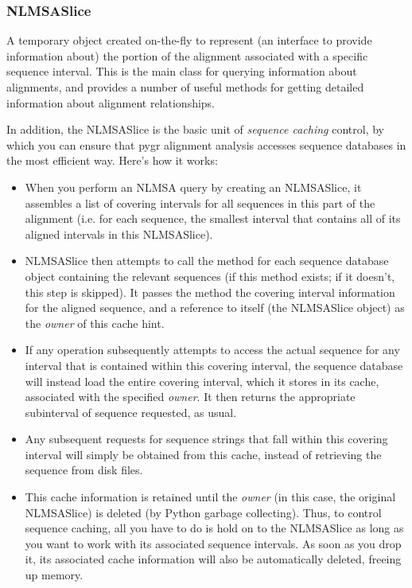 \documentclass{howto}
\begin{document}
\subsubsection{NLMSASlice}
A temporary object created on-the-fly to represent (an interface to provide 
information about) the portion of the alignment associated with a specific
sequence interval.  This is the main class for querying information about
alignments, and provides a number of useful methods for getting 
detailed information about alignment relationships.

In addition, the NLMSASlice is the basic unit of {\em sequence caching}
control, by which you can ensure that pygr alignment analysis accesses
sequence databases in the most efficient way.  Here's how it works:
\begin{itemize}
\item When you perform an NLMSA query by creating an NLMSASlice, it assembles
a list of covering intervals for all sequences in this part of the alignment
(i.e. for each sequence, the smallest interval that contains all of its
aligned intervals in this NLMSASlice).  

\item NLMSASlice then attempts to call the  method for each
sequence database object containing the relevant sequences (if this method 
exists; if it doesn't, this step is skipped).  It passes the  method 
the covering interval information for the aligned sequence, and a reference to 
itself (the NLMSASlice object) as the {\em owner} of this cache hint.

\item If any operation subsequently attempts to access the actual sequence
for any interval that is contained within this covering interval, the sequence
database will instead load the entire covering interval, which it stores in 
its cache, associated with the specified {\em owner}.  It then returns the
appropriate subinterval of sequence requested, as usual.

\item Any subsequent requests for sequence strings that fall within this 
covering interval will simply be obtained from this cache, instead of 
retrieving the sequence from disk files.

\item This cache information is retained until the {\em owner} (in this case,
the original NLMSASlice) is deleted (by Python garbage collecting).  Thus, to
control sequence caching, all you have to do is hold on to the NLMSASlice as
long as you want to work with its associated sequence intervals.  As soon as 
you drop it, its associated cache information will also be automatically deleted,
freeing up memory.
\end{itemize}
\end{document}
